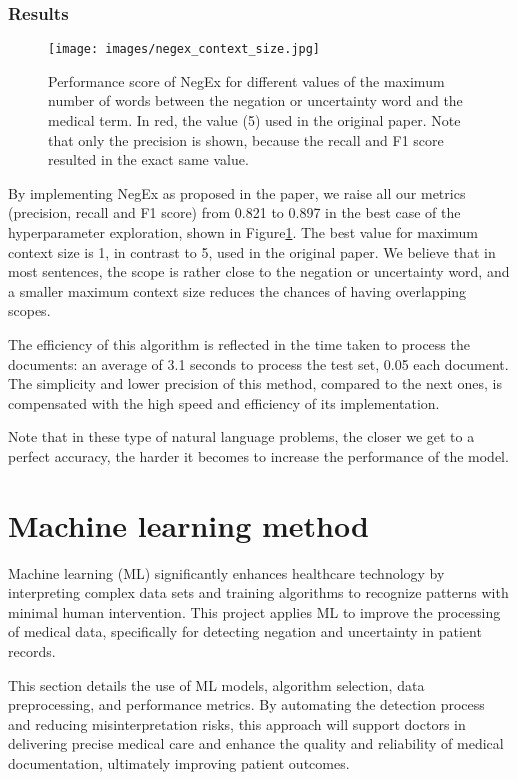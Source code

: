\documentclass{article}
\begin{document}
\subsubsection*{Results}

\begin{figure}[!t]
	\centering
	\texttt{[image: images/negex\_context\_size.jpg]}
	\captionsetup{width=0.9\textwidth}
	\caption{Performance score of NegEx for different values of the maximum number of words between the negation
	or uncertainty word and the medical term. In red, the value (5) used in the original paper. Note that only
	the precision is shown, because the recall and F1 score resulted in the exact same value.}
	\label{fig:negex_context_size}
\end{figure}

By implementing NegEx as proposed in the paper, we raise all our metrics (precision, recall and F1 score) from
0.821 to 0.897 in the best case of the hyperparameter exploration, shown in Figure\ref{fig:negex_context_size}.
The best value for maximum context size is 1, in contrast to 5, used in the original paper. We believe that in
most sentences, the scope is rather close to the negation or uncertainty word, and a smaller maximum context size
reduces the chances of having overlapping scopes.

The efficiency of this algorithm is reflected in the time taken to process the documents: an average of 3.1 seconds
to process the test set, 0.05 each document. The simplicity and lower precision of this method, compared to the
next ones, is compensated with the high speed and efficiency of its implementation.

Note that in these type of natural language problems, the closer we get to a perfect accuracy, the harder it becomes
to increase the performance of the model.

\section*{Machine learning method}
Machine learning (ML) significantly enhances healthcare technology by interpreting complex data sets and training
algorithms to recognize patterns with minimal human intervention. This project applies ML to improve the processing
of medical data, specifically for detecting negation and uncertainty in patient records. 

This section details the use of ML models, algorithm selection, data preprocessing, and performance metrics. By
automating the detection process and reducing misinterpretation risks, this approach will support doctors in
delivering precise medical care and enhance the quality and reliability of medical documentation, ultimately
improving patient outcomes.
\end{document}
